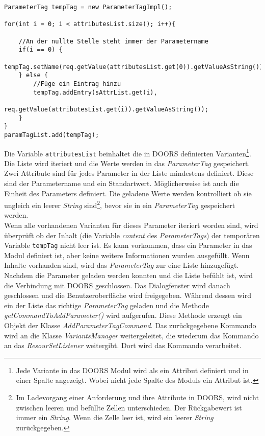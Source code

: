 \begin{lstlisting}[caption={Auszug von der Erstellung der ParameterTags}, captionpos=b,label={lst:CreateParamTag}]
ParameterTag tempTag = new ParameterTagImpl();
		
for(int i = 0; i < attributesList.size(); i++){
	
	//An der nullte Stelle steht immer der Parametername
	if(i == 0) {
		tempTag.setName(req.getValue(attributesList.get(0)).getValueAsString());
	} else {
		//Füge ein Eintrag hinzu 
		tempTag.addEntry(sAttrList.get(i),
				req.getValue(attributesList.get(i)).getValueAsString());
	}
}
paramTagList.add(tempTag);
\end{lstlisting}


Die Variable \texttt{attributesList} beinhaltet die in DOORS definierten Varianten\footnote{Jede Variante in das DOORS Modul wird als ein Attribut definiert und in einer Spalte angezeigt. Wobei nicht jede Spalte des Moduls ein Attribut ist.}. Die Liste wird iteriert und die Werte werden in das \textit{ParameterTag} gespeichert. Zwei Attribute sind für jedes Parameter in der Liste mindestens definiert. Diese sind der Parametername und ein Standartwert. Möglicherweise ist auch die Einheit des Parameters definiert. Die geladene Werte werden kontrolliert ob sie ungleich ein leerer \textit{String} sind\footnote{Im Ladevorgang einer Anforderung und ihre Attribute in DOORS, wird nicht zwischen leeren und befüllte Zellen unterschieden. Der Rückgabewert ist immer ein \textit{String}. Wenn die Zelle leer ist, wird ein leerer \textit{String} zurückgegeben.}, bevor sie in ein \textit{ParameterTag} gespeichert werden.\\


Wenn alle vorhandenen Varianten für dieses Parameter iteriert worden sind, wird überprüft ob der Inhalt (die Variable \textit{content} des \textit{ParameterTags}) der temporären Variable \texttt{tempTag} nicht leer ist. Es kann vorkommen, dass ein Parameter in das Modul definiert ist, aber keine weitere Informationen wurden ausgefüllt. Wenn Inhalte vorhanden sind, wird das \textit{ParameterTag} zur eine Liste hinzugefügt.\\

Nachdem die Parameter geladen werden konnten und die Liste befühlt ist, wird die Verbindung mit DOORS geschlossen. Das Dialogfenster wird danach geschlossen und die Benutzeroberfläche wird freigegeben. Während dessen wird ein der Liste das richtige \textit{ParameterTag} geladen und die Methode \textit{getCommandToAddParameter()} wird aufgerufen. Diese Methode erzeugt ein Objekt der Klasse \textit{AddParameterTagCommand}. Das zurückgegebene Kommando wird an die Klasse \textit{VariantsManager} weitergeleitet, die wiederum das Kommando an das \textit{ResourSetListener} weitergibt. Dort wird das Kommando verarbeitet.\\


